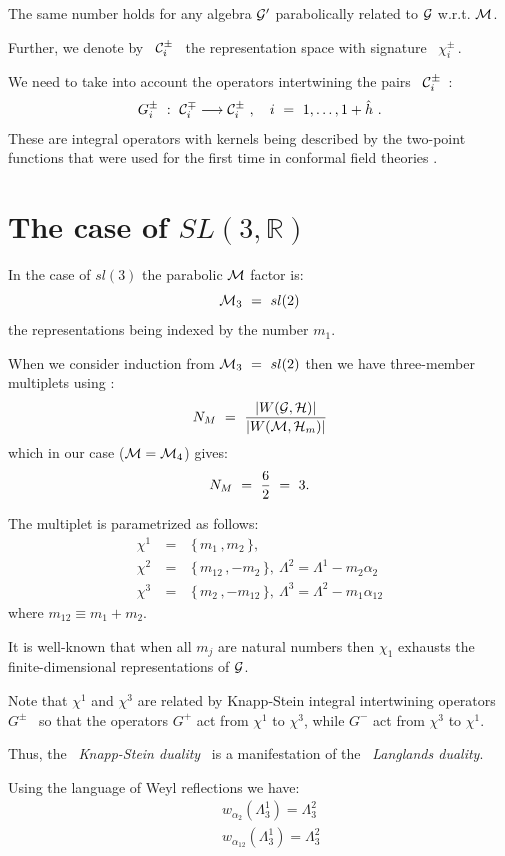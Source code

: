 \documentclass[a4paper]{jpconf}
\def\beq{\begin{equation}}
\def\eqn#1{\beq\label{#1}}
\def\ee{\end{equation}}
\def\bb {\begin {eqnarray}}
\def\eqnn#1{\bb\label{#1}}
\def\eea {\end {eqnarray}}
\def\hh{{\hat h}}
\def\nn{\nonumber}
\def\lra{\longrightarrow}
\def\bbr{\mathbb{R}}%
\def\a{\alpha}
\def\cg{{\cal G}} \def\ch{{\cal H}} \def\ci{{\cal I}}
\def\cm{{\cal M}} \def\cn{{\cal N}} \def\co{{\cal O}}
\def\L{\Lambda}
\begin{document}
  The same number holds for
any algebra $\cg'$ parabolically related to $\cg$ w.r.t. $\cm$.





 Further, we denote by ~${\cal C}^\pm_i$~ the representation space with signature
~$\chi^\pm_i\,$.

We need to take into account the operators intertwining the pairs ~${\cal C}^\pm_i$~:
\eqn{knapps}
G^\pm_i ~:~ \cc^\mp_i \lra \cc^\pm_{i}   \ , \quad i ~=~
1,\ldots,1+\hh  \ . \ee
These are integral operators with kernels being described by the two-point functions that were used for
the first time in conformal field theories \cite{VKD1}.





\section{The case of $SL(3,\bbr)$}

In the case of $sl(3)$ the  parabolic $\cm$ factor is:
\eqn{su22m} \cm_3 ~=~ sl(2) \ee
the representations being indexed by the number $m_1$.

When we consider   induction from $\cm_3 ~=~ sl(2) $ then we have  three-member multiplets
using   \cite{VKD1}:
\eqn{redun} N_M ~=~  {\vert W(\cg,\ch) \vert \over \vert W(\cm,\ch_m) \vert} \ee
which in our case ($\cm=\cm_4$) gives:
\eqn{redu22} N_M ~=~  {6 \over 2} ~=~ 3. \ee


The multiplet is parametrized as follows:
\eqnn{tabsu22}
\chi^1 ~&=&~ \{\, m_1\,, m_2\,
\}  , \\
\chi^2 ~&=&~ \{\, m_{12}\,, -m_{2}\,
\}  , \ \L^2 = \L^1 - m_2\a_2 \nn\\
 \chi^3 ~&=&~ \{\, m_{2}\,, -m_{12}\,
\}  , \ \L^3  = \L^2 - m_1\a_{12} \nn\eea
 where  $m_{12}\equiv m_1+m_2$.

 It is well-known that when all $m_j$ are natural numbers then $\chi_1$ exhausts the finite-dimensional representations of $\cg$.

  Note that $\chi^1$ and $\chi^3$  are related by Knapp-Stein \cite{KnSt} integral intertwining operators ~$G^\pm$~ so that
the operators $G^+$ act from $\chi^1$ to $\chi^3$, while $G^-$ act from $\chi^3$ to $\chi^1$.

 Thus, the ~{\it Knapp-Stein duality}~ is a manifestation of the ~{\it Langlands duality}.





Using the language of Weyl reflections we have:
\eqnn{slthr} && w_{\a_2} (\L^1_3) = \L^2_3 \\
&& w_{\a_{12}} (\L^1_3) = \L^2_3 \nn
\eea
\end{document}
